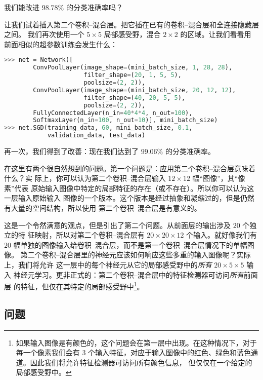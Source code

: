 我们能改进 $98.78$\% 的分类准确率吗？

让我们试着插入第二个卷积--混合层。把它插在已有的卷积--混合层和全连接隐藏层之间。
我们再次使用一个 $5 \times 5$ 局部感受野，混合 $2 \times 2$ 的区域。让我们看看用
前面相似的超参数训练会发生什么：
\begin{lstlisting}[language=Python]
>>> net = Network([
        ConvPoolLayer(image_shape=(mini_batch_size, 1, 28, 28), 
                      filter_shape=(20, 1, 5, 5), 
                      poolsize=(2, 2)),
        ConvPoolLayer(image_shape=(mini_batch_size, 20, 12, 12), 
                      filter_shape=(40, 20, 5, 5), 
                      poolsize=(2, 2)),
        FullyConnectedLayer(n_in=40*4*4, n_out=100),
        SoftmaxLayer(n_in=100, n_out=10)], mini_batch_size)
>>> net.SGD(training_data, 60, mini_batch_size, 0.1, 
            validation_data, test_data)        
\end{lstlisting}

再一次，我们得到了改善：现在我们达到了 $99.06$\% 的分类准确率。

在这里有两个很自然想到的问题。第一个问题是：应用第二个卷积--混合层意味着什么？实
际上，你可以认为第二个卷积--混合层输入 $12 \times 12$ 幅“图像”，其“像素”代表
原始输入图像中特定的局部特征的存在（或不存在）。所以你可以认为这一层输入原始输入
图像的一个版本。这个版本是经过抽象和凝缩过的，但是仍然有大量的空间结构，所以使用
第二个卷积--混合层是有意义的。

这是一个令然满意的观点，但是引出了第二个问题。从前面层的输出涉及 $20$ 个独立的特
征映射，所以对第二个卷积--混合层有 $20 \times 20 \times 12$ 个输入。就好像我们有
$20$ 幅单独的图像输入给卷积--混合层，而不是第一个卷积--混合层情况下的单幅图像。
第二个卷积--混合层里的神经元应该如何响应这些多重的输入图像呢？实际上，我们将允许
这一层中的每个神经元从它的局部感受野中的\emph{所有} $20 \times 5 \times 5$ 输入
神经元学习。更非正式的：第二个卷积--混合层中的特征检测器可访问\emph{所有}前面层
的特征，但仅在其特定的局部感受野中\footnote{
如果输入图像是有颜色的，这个问题会在第一层中出现。在这种情况下，对于每一个像素我们会有 3 
个输入特征，对应于输入图像中的红色、绿色和蓝色通道。因此我们将允许特征检测器可访问所有颜色信息，
但仅仅在一个给定的局部感受野中。}。

\subsection*{问题}

